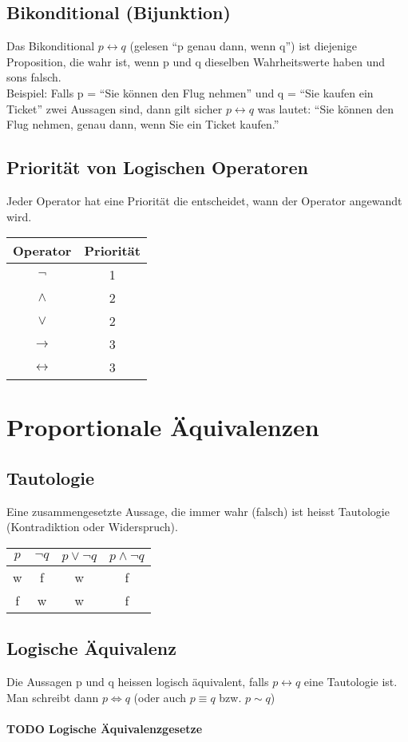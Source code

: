 \documentclass[10pt,a4paper]{article}
\begin{document}
\subsection{Bikonditional (Bijunktion)}Das Bikonditional $p \leftrightarrow q$ (gelesen "`p genau dann, wenn q"') ist diejenige Proposition, die wahr ist, wenn p und q dieselben Wahrheitswerte haben und sons falsch.\\
Beispiel: Falls p = "`Sie können den Flug nehmen"' und q = "`Sie kaufen ein Ticket"' zwei Aussagen sind, dann gilt sicher $p \leftrightarrow q$ was lautet: "`Sie können den Flug nehmen, genau dann, wenn Sie ein Ticket kaufen."'

\subsection{Priorität von Logischen Operatoren}Jeder Operator hat eine Priorität die entscheidet, wann der Operator angewandt wird.\\
\begin{tabular}{|c|c|}
    \hline
        Operator&Priorität\\
        \hline
        $\neg$ &1\\
        \hline
        $\wedge$ &2\\
        $\vee$ &2\\
        \hline
        $\rightarrow$ &3\\
        $\leftrightarrow$ &3\\
    \hline
\end{tabular}

\section{Proportionale Äquivalenzen}

\subsection{Tautologie}Eine zusammengesetzte Aussage, die immer wahr (falsch) ist heisst Tautologie (Kontradiktion oder Widerspruch).\\
\begin{tabular}{|c|c|c|c|}
    \hline
        $p$&$\neg q$&$p \vee \neg q$&$p \wedge \neg q$\\
        \hline
        w&f&w&f\\
        f&w&w&f\\
    \hline
\end{tabular}

\subsection{Logische Äquivalenz}Die Aussagen p und q heissen logisch äquivalent, falls $p \leftrightarrow q$ eine Tautologie ist. Man schreibt dann $p \Leftrightarrow q$ (oder auch $p \equiv q$ bzw. $p \sim q$)
\paragraph{TODO Logische Äquivalenzgesetze}
\end{document}
